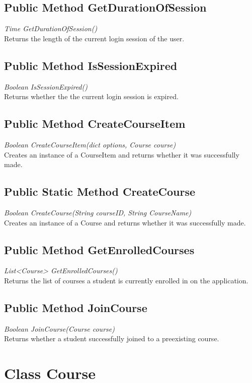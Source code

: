 \documentclass{scrreprt}
\begin{document}
\subsection{Public Method GetDurationOfSession}
\textit{Time GetDurationOfSession()} \\
Returns the length of the current login session of the user.

\subsection{Public Method IsSessionExpired}
\textit{Boolean IsSessionExpired()} \\
Returns whether the the current login session is expired.

\subsection{Public Method CreateCourseItem}
\textit{Boolean CreateCourseItem(dict options, Course course)} \\
Creates an instance of a CourseItem and returns whether it was 		successfully made.

\subsection{Public Static Method CreateCourse}
\textit{Boolean CreateCourse(String courseID, String CourseName)} \\
Creates an instance of a Course and returns whether it was			 successfully made.

\subsection{Public Method GetEnrolledCourses}
\textit{List<Course> GetEnrolledCourses()} \\
Returns the list of courses a student is currently enrolled in on the application.

\subsection{Public Method JoinCourse}
\textit{Boolean JoinCourse(Course course)} \\
Returns whether a student successfully joined to a preexisting course.

\section{Class Course}
\end{document}
